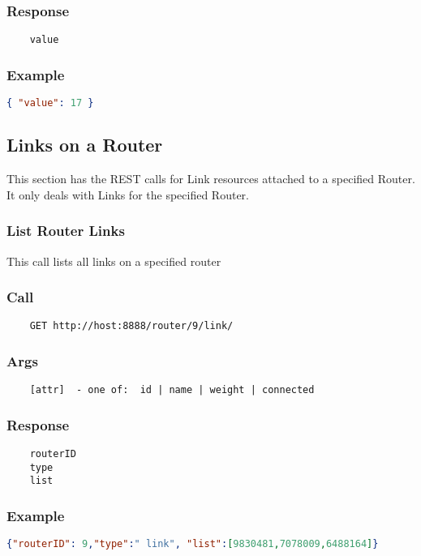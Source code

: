 \subsubsection*{Response}
\begin{verbatim}
	value
\end{verbatim}

\subsubsection*{Example}
\begin{lstlisting}[language=json]
{ "value": 17 }
\end{lstlisting}

\subsection{Links on a Router}

This section has the REST calls for Link resources attached to a specified Router. It only deals with Links for the specified Router.

\hr
\subsubsection{List Router Links}
This call lists all links on a specified router
\subsubsection*{Call}
\begin{verbatim}
	GET http://host:8888/router/9/link/
\end{verbatim}

\subsubsection*{Args}
\begin{verbatim}
	[attr]  - one of:  id | name | weight | connected
\end{verbatim}

\subsubsection*{Response}
\begin{verbatim}
	routerID
	type
	list
\end{verbatim}

\subsubsection*{Example}
\begin{lstlisting}[language=json]
{"routerID": 9,"type":" link", "list":[9830481,7078009,6488164]}
\end{lstlisting}



